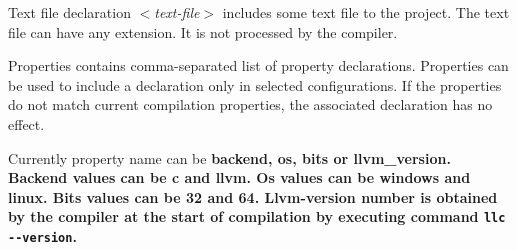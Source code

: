 \documentclass[a4paper,oneside,11pt]{article}
\begin{document}
Text file declaration \emph{$<$text-file$>$} includes some text file to the project.
The text file can have any extension. It is not processed by the compiler.

Properties contains comma-separated list of property declarations.
Properties can be used to include a declaration only in selected configurations.
If the properties do not match current compilation properties, the associated declaration has no effect.

Currently property name can be \bf{backend}, \bf{os}, \bf{bits} or \bf{llvm\_version}.
Backend values can be \bf{c} and \bf{llvm}.
Os values can be \bf{windows} and \bf{linux}.
Bits values can be \bf{32} and \bf{64}.
Llvm-version number is obtained by the compiler at the start of compilation by executing command \verb|llc --version|.

\clearpage
\end{document}
